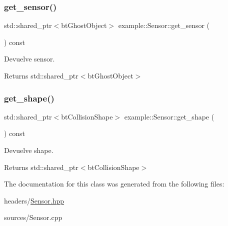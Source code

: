 \subsubsection{\texorpdfstring{get\_sensor()}{get\_sensor()}}
{\footnotesize\ttfamily std\+::shared\+\_\+ptr$<$bt\+Ghost\+Object$>$ example\+::\+Sensor\+::get\+\_\+sensor (\begin{DoxyParamCaption}{ }\end{DoxyParamCaption}) const\hspace{0.3cm}{\ttfamily [inline]}}



Devuelve sensor. 

\begin{DoxyReturn}{Returns}
std\+::shared\+\_\+ptr$<$bt\+Ghost\+Object$>$ 
\end{DoxyReturn}
\mbox{\label{classexample_1_1_sensor_a80e5f857d87c6d7bb02d846924d95165}} 
\subsubsection{\texorpdfstring{get\_shape()}{get\_shape()}}
{\footnotesize\ttfamily std\+::shared\+\_\+ptr$<$bt\+Collision\+Shape$>$ example\+::\+Sensor\+::get\+\_\+shape (\begin{DoxyParamCaption}{ }\end{DoxyParamCaption}) const\hspace{0.3cm}{\ttfamily [inline]}}



Devuelve shape. 

\begin{DoxyReturn}{Returns}
std\+::shared\+\_\+ptr$<$bt\+Collision\+Shape$>$ 
\end{DoxyReturn}


The documentation for this class was generated from the following files\+:\begin{DoxyCompactItemize}
\item 
headers/\mbox{\hyperlink{_sensor_8hpp}{Sensor.\+hpp}}\item 
sources/Sensor.\+cpp\end{DoxyCompactItemize}
